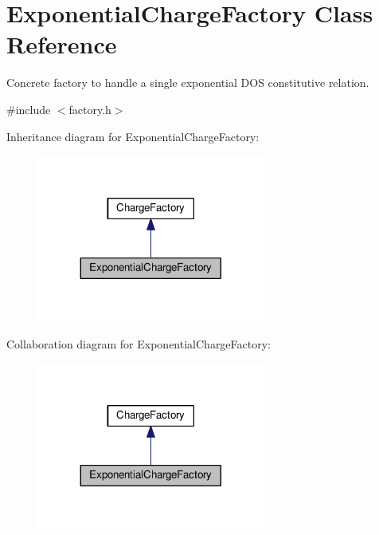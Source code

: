 \hypertarget{classExponentialChargeFactory}{\section{Exponential\-Charge\-Factory Class Reference}
\label{classExponentialChargeFactory}
}


Concrete factory to handle a single exponential D\-O\-S constitutive relation.  




{\ttfamily \#include $<$factory.\-h$>$}



Inheritance diagram for Exponential\-Charge\-Factory\-:\nopagebreak
\begin{figure}[H]
\begin{center}
\leavevmode
\includegraphics[width=212pt]{classExponentialChargeFactory__inherit__graph}
\end{center}
\end{figure}


Collaboration diagram for Exponential\-Charge\-Factory\-:\nopagebreak
\begin{figure}[H]
\begin{center}
\leavevmode
\includegraphics[width=212pt]{classExponentialChargeFactory__coll__graph}
\end{center}
\end{figure}
